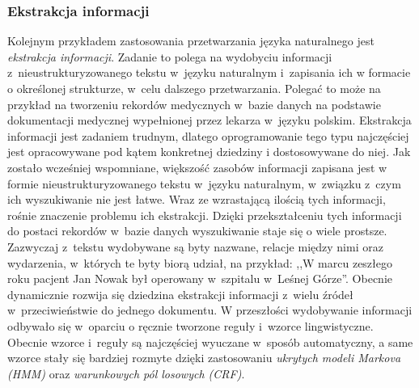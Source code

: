 \documentclass[a4paper, twoside, 12pt]{report}
\begin{document}
            \subsubsection{Ekstrakcja informacji}
                Kolejnym przykładem zastosowania przetwarzania języka naturalnego jest \emph{ekstrakcja informacji}. Zadanie
                to polega na wydobyciu informacji z~nieustrukturyzowanego tekstu w~języku naturalnym i~zapisania ich w
                formacie o określonej strukturze, w~celu dalszego
                przetwarzania. Polegać to może na przykład na tworzeniu rekordów medycznych w~bazie danych na podstawie
                dokumentacji medycznej wypełnionej przez lekarza w~języku polskim. Ekstrakcja informacji jest zadaniem
                trudnym, dlatego oprogramowanie tego typu najczęściej jest opracowywane pod kątem konkretnej dziedziny i
                dostosowywane do niej. Jak zostało wcześniej wspomniane, większość zasobów informacji zapisana jest w
                formie nieustrukturyzowanego tekstu w~języku naturalnym, w~związku z~czym ich wyszukiwanie nie jest łatwe.
                Wraz ze wzrastającą ilością tych informacji, rośnie znaczenie problemu ich ekstrakcji. Dzięki
                przekształceniu tych informacji do postaci rekordów w~bazie danych wyszukiwanie staje się o wiele prostsze.
                Zazwyczaj z~tekstu wydobywane są byty nazwane, relacje między nimi oraz wydarzenia, w~których te byty
                biorą udział, na przykład: ,,W marcu zeszłego roku pacjent Jan Nowak był operowany w~szpitalu w~Leśnej
                Górze''. Obecnie dynamicznie rozwija się dziedzina ekstrakcji informacji z~wielu źródeł w~przeciwieństwie
                do jednego dokumentu. W przeszłości wydobywanie informacji odbywało się w~oparciu o ręcznie tworzone
                reguły i~wzorce lingwistyczne. Obecnie wzorce i~reguły są najczęściej wyuczane w~sposób automatyczny,
                a same wzorce stały się bardziej rozmyte dzięki zastosowaniu \emph{ukrytych modeli Markova (HMM)} oraz
                \emph{warunkowych pól losowych (CRF)}\cite{INFORMATIONEXTRACTION}.
\end{document}
